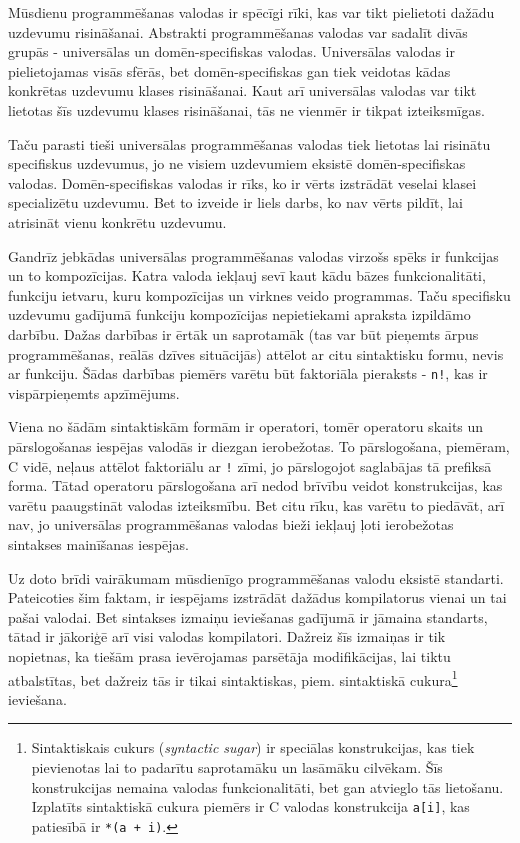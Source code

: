 Mūsdienu programmēšanas valodas ir spēcīgi rīki, kas var tikt pielietoti dažādu uzdevumu risināšanai. Abstrakti programmēšanas valodas var sadalīt divās grupās - universālas un domēn-specifiskas valodas. Universālas valodas ir pielietojamas visās sfērās, bet domēn-specifiskas gan tiek veidotas kādas konkrētas uzdevumu klases risināšanai. Kaut arī universālas valodas var tikt lietotas šīs uzdevumu klases risināšanai, tās ne vienmēr ir tikpat izteiksmīgas.

Taču parasti tieši universālas programmēšanas valodas tiek lietotas lai risinātu specifiskus uzdevumus, jo ne visiem uzdevumiem eksistē domēn-specifiskas valodas. Domēn-specifiskas valodas ir rīks, ko ir vērts izstrādāt veselai klasei specializētu uzdevumu. Bet to izveide ir liels darbs, ko nav vērts pildīt, lai atrisināt vienu konkrētu uzdevumu.

Gandrīz jebkādas universālas programmēšanas valodas virzošs spēks ir funkcijas un to kompozīcijas. Katra valoda iekļauj sevī kaut kādu bāzes funkcionalitāti, funkciju ietvaru, kuru kompozīcijas un virknes veido programmas. Taču specifisku uzdevumu gadījumā funkciju kompozīcijas nepietiekami apraksta izpildāmo darbību. Dažas darbības ir ērtāk un saprotamāk (tas var būt pieņemts ārpus programmēšanas, reālās dzīves situācijās) attēlot ar citu sintaktisku formu, nevis ar funkciju. Šādas darbības piemērs varētu būt faktoriāla pieraksts - \verb|n!|, kas ir vispārpieņemts apzīmējums.

Viena no šādām sintaktiskām formām ir operatori, tomēr operatoru skaits un pārslogošanas iespējas valodās ir diezgan ierobežotas. To pārslogošana, piemēram, C vidē, neļaus attēlot faktoriālu ar \verb|!| zīmi, jo pārslogojot saglabājas tā prefiksā forma. Tātad operatoru pārslogošana arī nedod brīvību veidot konstrukcijas, kas varētu paaugstināt valodas izteiksmību. Bet citu rīku, kas varētu to piedāvāt, arī nav, jo universālas programmēšanas valodas bieži iekļauj ļoti ierobežotas sintakses mainīšanas iespējas.

Uz doto brīdi vairākumam mūsdienīgo programmēšanas valodu eksistē standarti. Pateicoties šim faktam, ir iespējams izstrādāt dažādus kompilatorus vienai un tai pašai valodai. Bet sintakses izmaiņu ieviešanas gadījumā ir jāmaina standarts, tātad ir jākoriģē arī visi valodas kompilatori. Dažreiz šīs izmaiņas ir tik nopietnas, ka tiešām prasa ievērojamas parsētāja modifikācijas, lai tiktu atbalstītas, bet dažreiz tās ir tikai sintaktiskas, piem. sintaktiskā cukura\footnote{Sintaktiskais cukurs (\emph{syntactic sugar}) ir speciālas konstrukcijas, kas tiek pievienotas lai to padarītu saprotamāku un lasāmāku cilvēkam. Šīs konstrukcijas nemaina valodas funkcionalitāti, bet gan atvieglo tās lietošanu. Izplatīts sintaktiskā cukura piemērs ir C valodas konstrukcija \texttt{a[i]}, kas patiesībā ir \texttt{*(a + i)}.} ieviešana.

